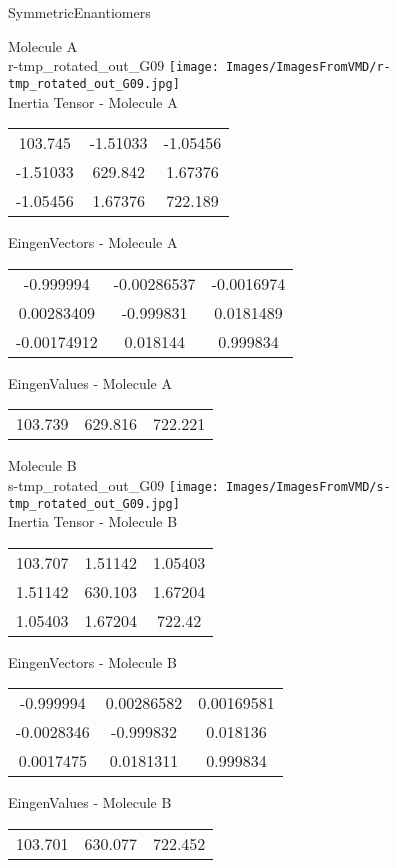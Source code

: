 \vtab[-2cm]
\begin{center}
{\large SymmetricEnantiomers}
\end{center}
\begin{multicols}{2}
\begin{center}
Molecule A \\ 
r-tmp\_rotated\_out\_G09
\texttt{[image: Images/ImagesFromVMD/r-tmp\_rotated\_out\_G09.jpg]}
\\
Inertia Tensor - Molecule A \\
\vtab
\begin{tabular}{|c c c|}
103.745	 & 	-1.51033	 & 	-1.05456	 \\
-1.51033	 & 	629.842	 & 	1.67376	 \\
-1.05456	 & 	1.67376	 & 	722.189
\end{tabular}

\vtab
 EingenVectors - Molecule A     \\
\vtab
\begin{tabular}{|c c c|}
-0.999994	 & 	-0.00286537	 & 	-0.0016974	 \\
0.00283409	 & 	-0.999831	 & 	0.0181489	 \\
-0.00174912	 & 	0.018144	 & 	0.999834
\end{tabular}

\vtab
 EingenValues - Molecule A     \\
\vtab
\begin{tabular}{|c c c|}
103.739	 & 	629.816	 & 	722.221
\end{tabular}
\columnbreak

Molecule B \\ 
s-tmp\_rotated\_out\_G09
\texttt{[image: Images/ImagesFromVMD/s-tmp\_rotated\_out\_G09.jpg]}
\\
Inertia Tensor - Molecule B \\
\vtab
\begin{tabular}{|c c c|}
103.707	 & 	1.51142	 & 	1.05403	 \\
1.51142	 & 	630.103	 & 	1.67204	 \\
1.05403	 & 	1.67204	 & 	722.42
\end{tabular}

\vtab
 EingenVectors - Molecule B     \\
\vtab
\begin{tabular}{|c c c|}
-0.999994	 & 	0.00286582	 & 	0.00169581	 \\
-0.0028346	 & 	-0.999832	 & 	0.018136	 \\
0.0017475	 & 	0.0181311	 & 	0.999834
\end{tabular}

\vtab
 EingenValues - Molecule B     \\
\vtab
\begin{tabular}{|c c c|}
103.701	 & 	630.077	 & 	722.452
\end{tabular}

\end{center}
\end{multicols}
